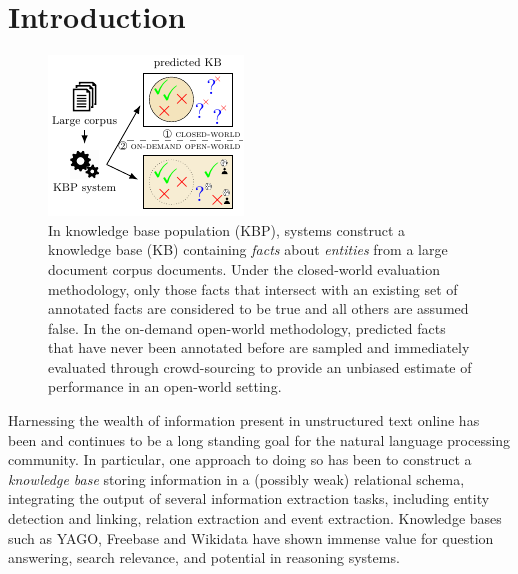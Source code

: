 \section{Introduction}
\label{sec:intro}

\begin{figure}[t]
  \includegraphics[width=\columnwidth]{figures/overview}
  \caption{\label{fig:task}
  In knowledge base population (KBP), systems construct a knowledge base (KB) containing \textit{facts} about \textit{entities} 
  from a large document corpus documents.
  Under the closed-world evaluation methodology, only those facts that intersect with an existing set of annotated facts
  are considered to be true and all others are assumed false.
  In the on-demand open-world methodology, predicted facts that have never been annotated before are sampled and immediately evaluated through crowd-sourcing to provide an unbiased estimate of performance in an open-world setting.
  }
\end{figure}

Harnessing the wealth of information present in unstructured text online has been and continues to be a long standing goal for the natural language processing community.
In particular, one approach to doing so has been to construct a \textit{knowledge base} storing information in a (possibly weak) relational schema, integrating the output of several information extraction tasks, including entity detection and linking, relation extraction and event extraction.
Knowledge bases such as YAGO, Freebase and Wikidata have shown immense value for question answering, search relevance, and potential in reasoning systems\needcite.

